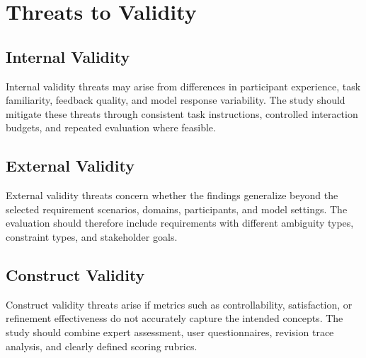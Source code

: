 \section{Threats to Validity}
\label{threats}

\subsection{Internal Validity}
\label{subsec:threats-internal}
Internal validity threats may arise from differences in participant experience, task familiarity, feedback quality, and model response variability. The study should mitigate these threats through consistent task instructions, controlled interaction budgets, and repeated evaluation where feasible.

\subsection{External Validity}
\label{subsec:threats-external}
External validity threats concern whether the findings generalize beyond the selected requirement scenarios, domains, participants, and model settings. The evaluation should therefore include requirements with different ambiguity types, constraint types, and stakeholder goals.

\subsection{Construct Validity}
\label{subsec:threats-construct}
Construct validity threats arise if metrics such as controllability, satisfaction, or refinement effectiveness do not accurately capture the intended concepts. The study should combine expert assessment, user questionnaires, revision trace analysis, and clearly defined scoring rubrics.
